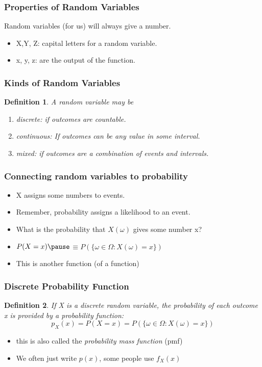 \documentclass[handout]{beamer}
\newtheorem{defn}{Definition}
\numberwithin{equation}{section}
\begin{document}
\begin{frame}
\frametitle{Properties of Random Variables}

Random variables (for us) will always give a number.
\begin{itemize}
\item X,Y, Z: capital letters for a random variable.
\item x, y, z: are the output of the function.
\end{itemize}
\end{frame}


\begin{frame}
\frametitle{Kinds of Random Variables}
\begin{defn}
A random variable may be 
\begin{enumerate}
\item discrete: if outcomes are countable.
\item continuous: If outcomes can be any value in some interval.
\item mixed: if outcomes are a combination of events and intervals.
\end{enumerate}
\end{defn}
\end{frame}


\begin{frame}
\frametitle{Connecting random variables to probability}
\begin{itemize}
\item X assigns some numbers to events.\pause
\item Remember, probability assigns a likelihood to an event.\pause
\item What is the probability that $X(\omega)$ gives some number x?\pause
\item $P(X=x)\pause $$ \equiv P(\{\omega \in \Omega : X(\omega)= x\})$
\item This is another function (of a function)
\end{itemize}
\end{frame}


\begin{frame}
\frametitle{Discrete Probability Function}
\begin{defn}

If X is a discrete random variable, the probability of each outcome x is provided by a probability function:
$$p_X(x)=P(X=x)=P(\{\omega \in \Omega: X(\omega)=x\})$$

\end{defn}
\begin{itemize}
\item this is also called the \emph{probability mass function} (pmf)
\item We often just write $p(x)$, some people use $f_X(x)$
\end{itemize}

\end{frame}
\end{document}
